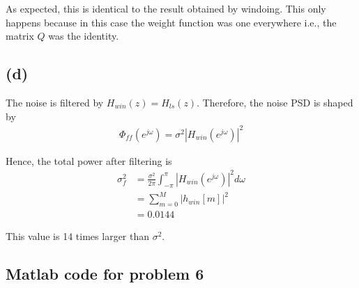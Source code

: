 \documentclass{article}
\begin{document}
As expected, this is identical to the result obtained by windoing. This only happens because in this case the weight function was one everywhere i.e., the matrix $Q$ was the identity.

\subsection{(d)}

The noise is filtered by $H_{win}(z) = H_{ls}(z)$. Therefore, the noise PSD is shaped by
\begin{align}
	\Phi_{ff}(e^{j\omega}) = \sigma^2|H_{win}(e^{j\omega})|^2
\end{align}

Hence, the total power after filtering is
\begin{align}
	\sigma_f^2 &= \frac{\sigma^2}{2\pi}\int_{-\pi}^{\pi}|H_{win}(e^{j\omega})|^2d\omega \\
	&= \sum_{m=0}^{M} |h_{win}[m]|^2 \\
	&= 0.0144
\end{align}

This value is 14 times larger than $\sigma^2$.

\subsection{Matlab code for problem 6}

\end{document}
